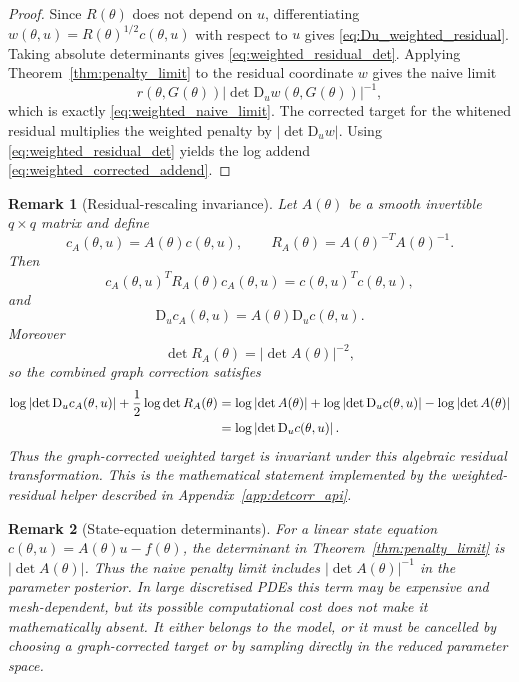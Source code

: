 \documentclass[11pt]{article}
\newtheorem{remark}{Remark}
\newcommand{\D}{\mathrm{D}}
\newcommand{\abs}[1]{\left\lvert #1\right\rvert}
\begin{document}
\begin{proof}
Since \(R(\theta)\) does not depend on \(u\), differentiating \(w(\theta,u)=R(\theta)^{1/2}c(\theta,u)\) with respect to \(u\) gives \eqref{eq:Du_weighted_residual}. Taking absolute determinants gives \eqref{eq:weighted_residual_det}. Applying Theorem~\ref{thm:penalty_limit} to the residual coordinate \(w\) gives the naive limit
\[
 r(\theta,G(\theta))
 \abs{\det \D_u w(\theta,G(\theta))}^{-1},
\]
which is exactly \eqref{eq:weighted_naive_limit}. The corrected target for the whitened residual multiplies the weighted penalty by \(\abs{\det \D_u w}\). Using \eqref{eq:weighted_residual_det} yields the log addend \eqref{eq:weighted_corrected_addend}.
\end{proof}

\begin{remark}[Residual-rescaling invariance]
\label{rem:weighted_rescaling_invariance}
Let \(A(\theta)\) be a smooth invertible \(q\times q\) matrix and define
\[
 c_A(\theta,u)=A(\theta)c(\theta,u),
 \qquad
 R_A(\theta)=A(\theta)^{-T}A(\theta)^{-1}.
\]
Then
\begin{equation}
 c_A(\theta,u)^T R_A(\theta)c_A(\theta,u)
 = c(\theta,u)^T c(\theta,u),
 \label{eq:rescaling_penalty_invariance}
\end{equation}
and
\[
 \D_u c_A(\theta,u)=A(\theta)\D_u c(\theta,u).
\]
Moreover
\[
 \det R_A(\theta)=\abs{\det A(\theta)}^{-2},
\]
so the combined graph correction satisfies
\begin{align}
 \log\abs{\det \D_u c_A(\theta,u)}+\frac{1}{2}\log\det R_A(\theta)
 &=
 \log\abs{\det A(\theta)}+\log\abs{\det \D_u c(\theta,u)}-\log\abs{\det A(\theta)} \notag\\
 &=
 \log\abs{\det \D_u c(\theta,u)}.
 \label{eq:combined_rescaling_correction}
\end{align}
Thus the graph-corrected weighted target is invariant under this algebraic residual transformation. This is the mathematical statement implemented by the weighted-residual helper described in Appendix~\ref{app:detcorr_api}.
\end{remark}

\begin{remark}[State-equation determinants]
For a linear state equation \(c(\theta,u)=A(\theta)u-f(\theta)\), the determinant in Theorem~\ref{thm:penalty_limit} is \(\abs{\det A(\theta)}\). Thus the naive penalty limit includes \(\abs{\det A(\theta)}^{-1}\) in the parameter posterior. In large discretised PDEs this term may be expensive and mesh-dependent, but its possible computational cost does not make it mathematically absent. It either belongs to the model, or it must be cancelled by choosing a graph-corrected target or by sampling directly in the reduced parameter space.
\end{remark}
\end{document}
